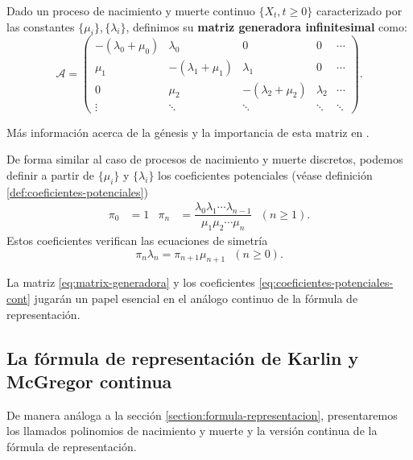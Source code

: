     \begin{definicion}
        Dado un proceso de nacimiento y muerte continuo $\{X_t, t\geq 0\}$ caracterizado por las constantes $\{\mu_i\}, \{\lambda_i\}$, definimos su \textbf{matriz generadora infinitesimal} como:
        \begin{equation}
            \label{eq:matrix-generadora}
            \mathcal A = \begin{pmatrix}
                -(\lambda_0+\mu_0) & \lambda_0 & 0 & 0 & \cdots \\
                \mu_1 & -(\lambda_1+\mu_1) & \lambda_1 & 0 & \cdots \\
                0 & \mu_2 & -(\lambda_2+\mu_2) & \lambda_2 & \cdots \\
                \vdots & \ddots & \ddots & \ddots & \ddots
            \end{pmatrix}.
        \end{equation}
    \end{definicion}

    Más información acerca de la génesis y la importancia de esta matriz en \cite[Section 2.1]{schoutens-2000}.

    De forma similar al caso de procesos de nacimiento y muerte discretos, podemos definir a partir de $\{\mu_i\}$ y $\{\lambda_i\}$ los coeficientes potenciales (véase definición \ref{def:coeficientes-potenciales})
    \begin{align}
        \label{eq:coeficientes-potenciales-cont}
        \pi_0&= 1 & \pi_n &= \dfrac{\lambda_0 \lambda_1 \cdots \lambda_{n-1}}{\mu_1 \mu_2 \cdots \mu_n} \ \ \ (n\geq 1).
    \end{align}
    Estos coeficientes verifican las ecuaciones de simetría
    \begin{equation}
        \label{eq:ecs-simetria-cont}
        \pi_n \lambda_n = \pi_{n+1}\mu_{n+1} \ \ \ (n\geq 0).
    \end{equation} 

    La matriz \eqref{eq:matrix-generadora} y los coeficientes \eqref{eq:coeficientes-potenciales-cont} jugarán un papel esencial en el análogo continuo de la fórmula de representación.

    \subsection{La fórmula de representación de Karlin y McGregor continua}

    De manera análoga a la sección \ref{section:formula-representacion}, presentaremos los llamados polinomios de nacimiento y muerte y la versión continua de la fórmula de representación.

